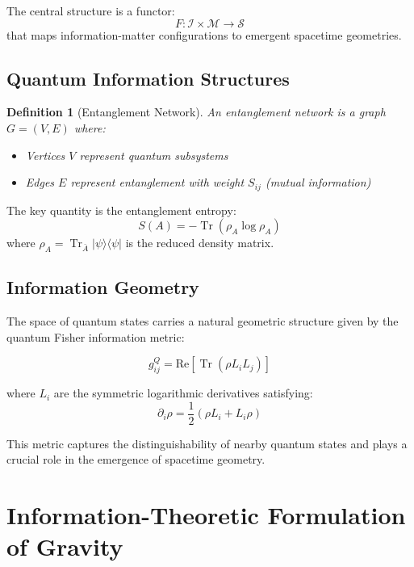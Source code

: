 \documentclass[12pt]{article}
\newtheorem{definition}[theorem]{Definition}
\DeclareMathOperator{\tr}{Tr}
\begin{document}
The central structure is a functor:
\begin{equation}
F: \mathcal{I} \times \mathcal{M} \to \mathcal{S}
\end{equation}
that maps information-matter configurations to emergent spacetime geometries.

\subsection{Quantum Information Structures}

\begin{definition}[Entanglement Network]
An entanglement network is a graph $G = (V, E)$ where:
\begin{itemize}
\item Vertices $V$ represent quantum subsystems
\item Edges $E$ represent entanglement with weight $S_{ij}$ (mutual information)
\end{itemize}
\end{definition}

The key quantity is the entanglement entropy:
\begin{equation}
S(A) = -\tr(\rho_A \log \rho_A)
\end{equation}
where $\rho_A = \tr_{\bar{A}}|\psi\rangle\langle\psi|$ is the reduced density matrix.

\subsection{Information Geometry}

The space of quantum states carries a natural geometric structure given by the quantum Fisher information metric:

\begin{equation}
g_{ij}^Q = \text{Re}\left[\tr\left(\rho L_i L_j\right)\right]
\end{equation}

where $L_i$ are the symmetric logarithmic derivatives satisfying:
\begin{equation}
\partial_i \rho = \frac{1}{2}(\rho L_i + L_i \rho)
\end{equation}

This metric captures the distinguishability of nearby quantum states and plays a crucial role in the emergence of spacetime geometry.

\section{Information-Theoretic Formulation of Gravity}
\end{document}
